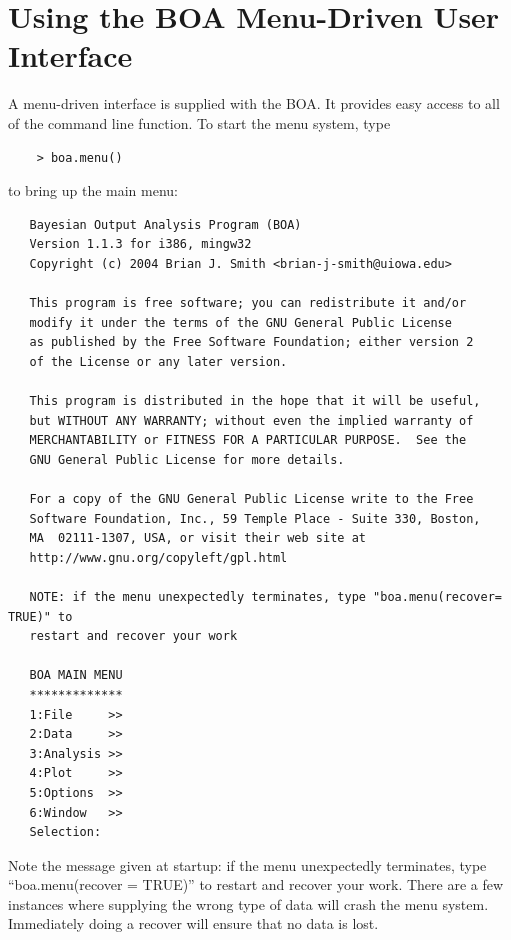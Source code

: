 \documentclass[12pt,letterpaper]{report}
\begin{document}
\chapter{Using the BOA Menu-Driven User Interface}
\noindent
A menu-driven interface is supplied with the BOA. It provides easy access to
all of the command line function. To start the menu system, type
\begin{small}
\begin{verbatim}
    > boa.menu()
\end{verbatim}
\end{small}
to bring up the main menu:
\begin{tiny}
\begin{verbatim}
   Bayesian Output Analysis Program (BOA)
   Version 1.1.3 for i386, mingw32
   Copyright (c) 2004 Brian J. Smith <brian-j-smith@uiowa.edu>

   This program is free software; you can redistribute it and/or
   modify it under the terms of the GNU General Public License
   as published by the Free Software Foundation; either version 2
   of the License or any later version.

   This program is distributed in the hope that it will be useful,
   but WITHOUT ANY WARRANTY; without even the implied warranty of
   MERCHANTABILITY or FITNESS FOR A PARTICULAR PURPOSE.  See the
   GNU General Public License for more details.

   For a copy of the GNU General Public License write to the Free
   Software Foundation, Inc., 59 Temple Place - Suite 330, Boston,
   MA  02111-1307, USA, or visit their web site at
   http://www.gnu.org/copyleft/gpl.html

   NOTE: if the menu unexpectedly terminates, type "boa.menu(recover= TRUE)" to
   restart and recover your work

   BOA MAIN MENU
   *************
   1:File     >>
   2:Data     >>
   3:Analysis >>
   4:Plot     >>
   5:Options  >>
   6:Window   >>
   Selection:
\end{verbatim}
\end{tiny}
Note the message given at startup: if the menu unexpectedly terminates, type
\linebreak ``boa.menu(recover = TRUE)'' to restart and recover your work. There
are a few instances where supplying the wrong type of data will crash the menu
system. Immediately doing a recover will ensure that no data is lost.
\end{document}
